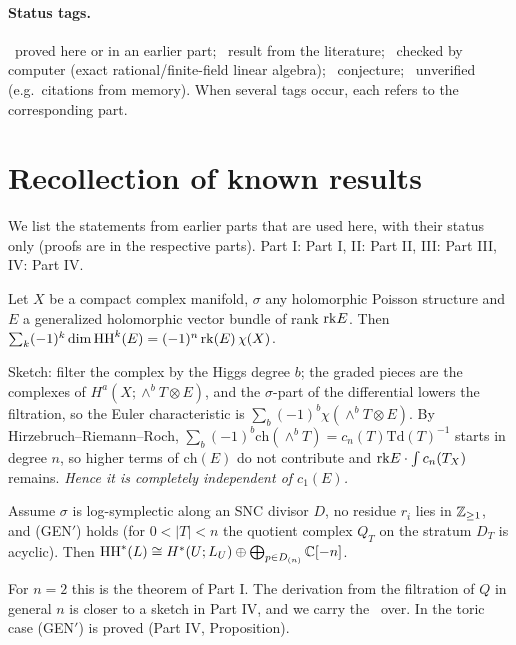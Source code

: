 \paragraph{Status tags.} \tP\ proved here or in an earlier part; \tC\ result from the literature; \tV\ checked by computer (exact rational/finite-field linear algebra); \tK\ conjecture; \tQ\ unverified (e.g.\ citations from memory). When several tags occur, each refers to the corresponding part.

\section{Recollection of known results}\label{p5:sec:recall}
We list the statements from earlier parts that are used here, with their status only (proofs are in the respective parts). Part I: Part I, II: Part II, III: Part III, IV: Part IV.

\begin{thm}\label{p5:thm:E}
Let $X$ be a compact complex manifold, $\sigma$ any holomorphic Poisson structure and $E$ a generalized holomorphic vector bundle of rank $\mathrm{rk} E$. Then $\sum_k(-1)^k\dim\mathrm{HH}^k(E)=(-1)^n\,\mathrm{rk}(E)\,\chi(X)$.
\end{thm}
Sketch: filter the complex by the Higgs degree $b$; the graded pieces are the complexes of $H^a(X;\wedge^bT\otimes E)$, and the $\sigma$-part of the differential lowers the filtration, so the Euler characteristic is $\sum_b(-1)^b\chi(\wedge^bT\otimes E)$. By Hirzebruch--Riemann--Roch, $\sum_b(-1)^b\mathrm{ch}(\wedge^bT)=c_n(T)\mathrm{Td}(T)^{-1}$ starts in degree $n$, so higher terms of $\mathrm{ch}(E)$ do not contribute and $\mathrm{rk} E\cdot\int c_n(T_X)$ remains. \emph{Hence it is completely independent of $c_1(E)$.}

\begin{thm}\label{p5:thm:R}
Assume $\sigma$ is log-symplectic along an SNC divisor $D$, no residue $r_i$ lies in $\mathbb Z_{\ge1}$, and (GEN$'$) holds (for $0<|T|<n$ the quotient complex $Q_T$ on the stratum $D_T$ is acyclic). Then $\mathrm{HH}^*(L)\cong H^*(U;L_U)\oplus\bigoplus_{p\in D_{(n)}}\mathbb C[-n]$.
\end{thm}
For $n=2$ this is the theorem of Part I. The derivation from the filtration of $Q$ in general $n$ is closer to a sketch in Part IV, and we carry the \tQ\ over. In the toric case (GEN$'$) is proved (Part IV, Proposition).

